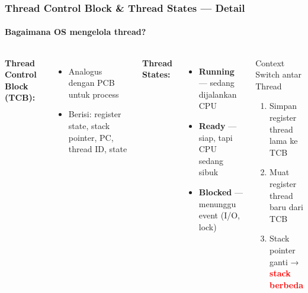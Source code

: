 \documentclass[t,aspectratio=169,xcolor=dvipsnames]{beamer}
\newcommand{\tem}[1]{\textbf{\textcolor{red}{#1}}}
\begin{document}
\begin{frame}
    \frametitle{Thread Control Block \& Thread States — Detail}
    \framesubtitle{Bagaimana OS mengelola thread?}
    \small

    \begin{columns}[T]
        \textbf{Thread Control Block (TCB):}
        \begin{itemize}
            \item Analogus dengan PCB untuk process
            \item Berisi: register state, stack pointer, PC, thread ID, state
        \end{itemize}

        \vspace{0.2cm}
        \textbf{Thread States:}
        \begin{itemize}
            \item \textbf{Running} — sedang dijalankan CPU
            \item \textbf{Ready} — siap, tapi CPU sedang sibuk
            \item \textbf{Blocked} — menunggu event (I/O, lock)
        \end{itemize}

        \begin{block}{Context Switch antar Thread}
            \begin{enumerate}
                \item Simpan register thread lama ke TCB
                \item Muat register thread baru dari TCB
                \item Stack pointer ganti → \tem{stack berbeda}
            \end{enumerate}
        \end{block}
    \end{columns}
\end{frame}
\end{document}

